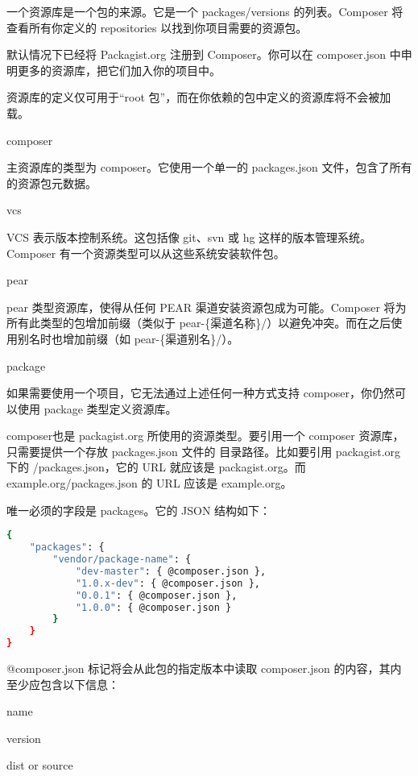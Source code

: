 一个资源库是一个包的来源。它是一个 packages/versions 的列表。Composer 将查看所有你定义的 repositories 以找到你项目需要的资源包。

默认情况下已经将 Packagist.org 注册到 Composer。你可以在 composer.json 中申明更多的资源库，把它们加入你的项目中。

资源库的定义仅可用于“root 包”，而在你依赖的包中定义的资源库将不会被加载。

\begin{compactitem}
\item composer

主资源库的类型为 composer。它使用一个单一的 packages.json 文件，包含了所有的资源包元数据。

\item vcs

VCS 表示版本控制系统。这包括像 git、svn 或 hg 这样的版本管理系统。Composer 有一个资源类型可以从这些系统安装软件包。

\item pear

pear 类型资源库，使得从任何 PEAR 渠道安装资源包成为可能。Composer 将为所有此类型的包增加前缀（类似于 pear-\{渠道名称\}/）以避免冲突。而在之后使用别名时也增加前缀（如 pear-\{渠道别名\}/）。

\item package

如果需要使用一个项目，它无法通过上述任何一种方式支持 composer，你仍然可以使用 package 类型定义资源库。

\end{compactitem}

composer也是 packagist.org 所使用的资源类型。要引用一个 composer 资源库，只需要提供一个存放 packages.json 文件的 目录路径。比如要引用 packagist.org 下的 /packages.json，它的 URL 就应该是 packagist.org。而 example.org/packages.json 的 URL 应该是 example.org。

唯一必须的字段是 packages。它的 JSON 结构如下：


\begin{lstlisting}[language=bash]
{
    "packages": {
        "vendor/package-name": {
            "dev-master": { @composer.json },
            "1.0.x-dev": { @composer.json },
            "0.0.1": { @composer.json },
            "1.0.0": { @composer.json }
        }
    }
}
\end{lstlisting}

@composer.json 标记将会从此包的指定版本中读取 composer.json 的内容，其内至少应包含以下信息：

\begin{compactitem}
\item name
\item version
\item dist or source
\end{compactitem}

